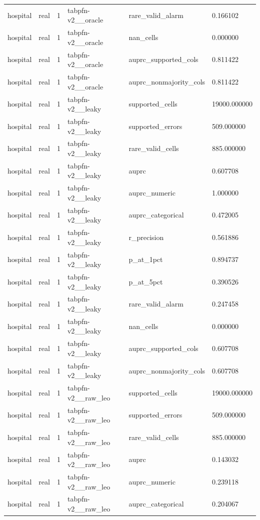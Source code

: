 \begin{tabular}{llllll}
hospital & real & 1 & tabpfn-v2\_\_oracle & rare\_valid\_alarm & 0.166102 \\
hospital & real & 1 & tabpfn-v2\_\_oracle & nan\_cells & 0.000000 \\
hospital & real & 1 & tabpfn-v2\_\_oracle & auprc\_supported\_cols & 0.811422 \\
hospital & real & 1 & tabpfn-v2\_\_oracle & auprc\_nonmajority\_cols & 0.811422 \\
hospital & real & 1 & tabpfn-v2\_\_leaky & supported\_cells & 19000.000000 \\
hospital & real & 1 & tabpfn-v2\_\_leaky & supported\_errors & 509.000000 \\
hospital & real & 1 & tabpfn-v2\_\_leaky & rare\_valid\_cells & 885.000000 \\
hospital & real & 1 & tabpfn-v2\_\_leaky & auprc & 0.607708 \\
hospital & real & 1 & tabpfn-v2\_\_leaky & auprc\_numeric & 1.000000 \\
hospital & real & 1 & tabpfn-v2\_\_leaky & auprc\_categorical & 0.472005 \\
hospital & real & 1 & tabpfn-v2\_\_leaky & r\_precision & 0.561886 \\
hospital & real & 1 & tabpfn-v2\_\_leaky & p\_at\_1pct & 0.894737 \\
hospital & real & 1 & tabpfn-v2\_\_leaky & p\_at\_5pct & 0.390526 \\
hospital & real & 1 & tabpfn-v2\_\_leaky & rare\_valid\_alarm & 0.247458 \\
hospital & real & 1 & tabpfn-v2\_\_leaky & nan\_cells & 0.000000 \\
hospital & real & 1 & tabpfn-v2\_\_leaky & auprc\_supported\_cols & 0.607708 \\
hospital & real & 1 & tabpfn-v2\_\_leaky & auprc\_nonmajority\_cols & 0.607708 \\
hospital & real & 1 & tabpfn-v2\_\_raw\_leo & supported\_cells & 19000.000000 \\
hospital & real & 1 & tabpfn-v2\_\_raw\_leo & supported\_errors & 509.000000 \\
hospital & real & 1 & tabpfn-v2\_\_raw\_leo & rare\_valid\_cells & 885.000000 \\
hospital & real & 1 & tabpfn-v2\_\_raw\_leo & auprc & 0.143032 \\
hospital & real & 1 & tabpfn-v2\_\_raw\_leo & auprc\_numeric & 0.239118 \\
hospital & real & 1 & tabpfn-v2\_\_raw\_leo & auprc\_categorical & 0.204067 \\

\end{tabular}
